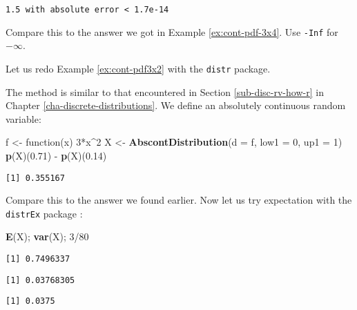 \documentclass[]{book}
\newenvironment{Shaded}{\begin{snugshade}}{\end{snugshade}}
\newcommand{\KeywordTok}[1]{\textcolor[rgb]{0.13,0.29,0.53}{\textbf{{#1}}}}
\newcommand{\DataTypeTok}[1]{\textcolor[rgb]{0.13,0.29,0.53}{{#1}}}
\newcommand{\DecValTok}[1]{\textcolor[rgb]{0.00,0.00,0.81}{{#1}}}
\newcommand{\FloatTok}[1]{\textcolor[rgb]{0.00,0.00,0.81}{{#1}}}
\newcommand{\StringTok}[1]{\textcolor[rgb]{0.31,0.60,0.02}{{#1}}}
\newcommand{\NormalTok}[1]{{#1}}
\numberwithin{equation}{chapter}
\numberwithin{figure}{chapter}
\theoremstyle{plain}
\theoremstyle{definition}
\theoremstyle{remark}
\theoremstyle{definition}
\theoremstyle{definition}
\theoremstyle{remark}
\let\BeginKnitrBlock\begin \let\EndKnitrBlock\end
\begin{document}
\begin{verbatim}
1.5 with absolute error < 1.7e-14
\end{verbatim}

Compare this to the answer we got in Example \ref{ex:cont-pdf-3x4}. Use
\texttt{-Inf} for \(-\infty\).

\bigskip

\BeginKnitrBlock{example}
\protect\hypertarget{ex:unnamed-chunk-258}{}{\label{ex:unnamed-chunk-258}}Let
us redo Example \ref{ex:cont-pdf3x2} with the \texttt{distr} package.
\EndKnitrBlock{example}

The method is similar to that encountered in Section
\ref{sub-disc-rv-how-r} in Chapter \ref{cha-discrete-distributions}. We
define an absolutely continuous random variable:

\begin{Shaded}
\begin{Highlighting}[]
\NormalTok{f <-}\StringTok{ }\NormalTok{function(x) }\DecValTok{3}\NormalTok{*x^}\DecValTok{2}
\NormalTok{X <-}\StringTok{ }\KeywordTok{AbscontDistribution}\NormalTok{(}\DataTypeTok{d =} \NormalTok{f, }\DataTypeTok{low1 =} \DecValTok{0}\NormalTok{, }\DataTypeTok{up1 =} \DecValTok{1}\NormalTok{)}
\KeywordTok{p}\NormalTok{(X)(}\FloatTok{0.71}\NormalTok{) -}\StringTok{ }\KeywordTok{p}\NormalTok{(X)(}\FloatTok{0.14}\NormalTok{)}
\end{Highlighting}
\end{Shaded}

\begin{verbatim}
[1] 0.355167
\end{verbatim}

Compare this to the answer we found earlier. Now let us try expectation
with the \texttt{distrEx} package \autocite{distrEx}:

\begin{Shaded}
\begin{Highlighting}[]
\KeywordTok{E}\NormalTok{(X); }\KeywordTok{var}\NormalTok{(X); }\DecValTok{3}\NormalTok{/}\DecValTok{80}
\end{Highlighting}
\end{Shaded}

\begin{verbatim}
[1] 0.7496337
\end{verbatim}

\begin{verbatim}
[1] 0.03768305
\end{verbatim}

\begin{verbatim}
[1] 0.0375
\end{verbatim}
\end{document}
